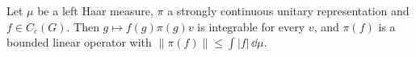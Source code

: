 Let $\mu$ be a left Haar measure, $\pi$ a strongly continuous unitary representation and $f\in C_c(G)$. Then $g\mapsto f(g)\pi(g)v$ is integrable for every $v$, and $\pi(f)$ is a bounded linear operator with $\|\pi(f)\|\le\int|f|\,\dd\mu$.
